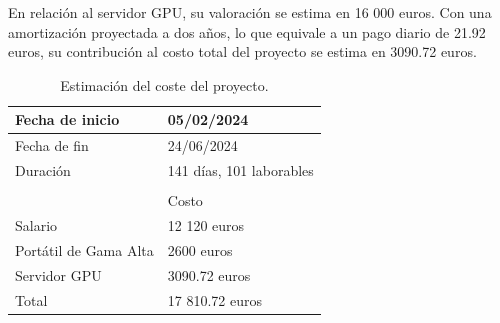 En relación al servidor GPU, su valoración se estima en 16 000 euros. Con una amortización proyectada a dos años, lo que equivale a un pago diario de 21.92 euros, su contribución al costo total del proyecto se estima en 3090.72 euros.


\begin{table}[H]
	\centering
	\begin{tabular}{ll}
	\hline
	\multicolumn{1}{|l|}{\cellcolor[HTML]{FFCB2F}Fecha de inicio} & \multicolumn{1}{l|}{05/02/2024} \\ \hline
	\multicolumn{1}{|l|}{\cellcolor[HTML]{FFCB2F}Fecha de fin} & \multicolumn{1}{l|}{24/06/2024} \\ \hline
	\multicolumn{1}{|l|}{\cellcolor[HTML]{FFCB2F}Duración} & \multicolumn{1}{l|}{141 días, 101 laborables} \\ \hline
	 &  \\ \hline
	\rowcolor[HTML]{FFCB2F} 
	\multicolumn{1}{|l|}{\cellcolor[HTML]{FFCB2F}Item} & \multicolumn{1}{l|}{\cellcolor[HTML]{FFCB2F}Costo} \\ \hline
	\multicolumn{1}{|l|}{Salario} & \multicolumn{1}{l|}{12 120 euros} \\ \hline
	\multicolumn{1}{|l|}{Portátil de Gama Alta} & \multicolumn{1}{l|}{2600 euros} \\ \hline
	\multicolumn{1}{|l|}{Servidor GPU} & \multicolumn{1}{l|}{3090.72 euros} \\ \hline
	\multicolumn{1}{|l|}{\cellcolor[HTML]{FFCB2F}Total} & \multicolumn{1}{l|}{17 810.72 euros} \\ \hline
	\end{tabular}
	\caption{Estimación del coste del proyecto.}
	\label{tab:coste-proyecto}
\end{table}